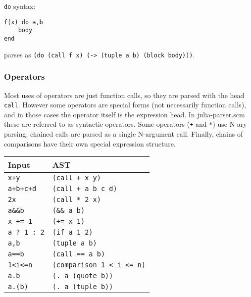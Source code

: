 \texttt{do} syntax:




\begin{verbatim}
f(x) do a,b
    body
end
\end{verbatim}



parses as \texttt{(do (call f x) (-> (tuple a b) (block body)))}.



\hypertarget{16991843071018324380}{}


\subsubsection{Operators}



Most uses of operators are just function calls, so they are parsed with the head \texttt{call}. However some operators are special forms (not necessarily function calls), and in those cases the operator itself is the expression head. In julia-parser.scm these are referred to as {\textquotedbl}syntactic operators{\textquotedbl}. Some operators (\texttt{+} and \texttt{*}) use N-ary parsing; chained calls are parsed as a single N-argument call. Finally, chains of comparisons have their own special expression structure.




\begin{table}[h]

\begin{tabulary}{\linewidth}{|L|L|}
\hline
Input & AST \\
\hline
\texttt{x+y} & \texttt{(call + x y)} \\
\hline
\texttt{a+b+c+d} & \texttt{(call + a b c d)} \\
\hline
\texttt{2x} & \texttt{(call * 2 x)} \\
\hline
\texttt{a\&\&b} & \texttt{(\&\& a b)} \\
\hline
\texttt{x += 1} & \texttt{(+= x 1)} \\
\hline
\texttt{a ? 1 : 2} & \texttt{(if a 1 2)} \\
\hline
\texttt{a,b} & \texttt{(tuple a b)} \\
\hline
\texttt{a==b} & \texttt{(call == a b)} \\
\hline
\texttt{1<i<=n} & \texttt{(comparison 1 < i <= n)} \\
\hline
\texttt{a.b} & \texttt{(. a (quote b))} \\
\hline
\texttt{a.(b)} & \texttt{(. a (tuple b))} \\
\hline
\end{tabulary}

\end{table}



